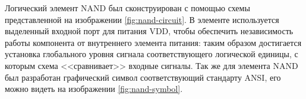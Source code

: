 Логический элемент NAND был сконструирован с помощью схемы представленной на
изображении \ref{fig:nand-circuit}. 
В элементе используется выделенный входной порт для питания VDD, чтобы
обеспечить независимость работы компонента от внутреннего элемента питания:
таким образом достигается установка глобального уровня сигнала соответствующего
логической единицы, с которым схема <<сравнивает>> входные сигналы. 
Так же для элемента NAND был разработан графический символ соответствующий
стандарту ANSI, его можно видеть на изображении \ref{fig:nand-symbol}.
\\
